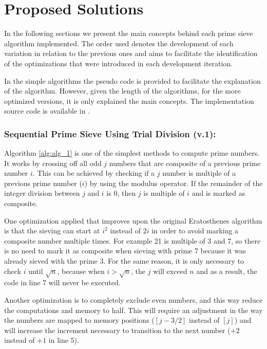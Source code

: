 \documentclass[runningheads,a4paper]{llncs}
\begin{document}
\section{Proposed Solutions}
\label{Proposed Solution}

In the following sections we present the main concepts behind each prime sieve algorithm implemented. The order used denotes the development of each variation in relation to the previous ones and aims to facilitate the identification of the optimizations that were introduced in each development iteration.

In the simple algorithms the pseudo code is provided to facilitate the explanation of the algorithm. However, given the length of the algorithms, for the more optimized versions, it is only explained the main concepts. The implementation source code is available in \cite{costa2013}.

\subsubsection{Sequential Prime Sieve Using Trial Division (v.1):}
\label{Sequential Prime Sieve Using Trial Division}

Algorithm \ref{alg:alg_1} is one of the simplest methods to compute prime numbers. It works by crossing off all odd $j$ numbers that are composite of a previous prime number $i$. This can be achieved by checking if a $j$ number is multiple of a previous prime number ($i$) by using the modulus operator. If the remainder of the integer division between $j$ and $i$ is 0, then $j$ is multiple of $i$ and is marked as composite.

One optimization applied that improves upon the original Eratosthenes algorithm is that the sieving can start at $i^2$ instead of $2i$ in order to avoid marking a composite number multiple times. For example 21 is multiple of 3 and 7, so there is no need to mark it as composite when sieving with prime 7 because it was already sieved with the prime 3. For the same reason, it is only necessary to check $i$ until $\sqrt{n}$, because when $i > \sqrt{n}$, the $j$ will exceed $n$ and as a result, the code in line 7 will never be executed.

Another optimization is to completely exclude even numbers, and this way reduce the computations and memory to half. This will require an adjustment in the way the numbers are mapped to memory positions ($[j - 3 / 2]$ instead of $[j]$) and will increase the increment necessary to transition to the next number ($+2$ instead of $+1$ in line 5).
\end{document}
